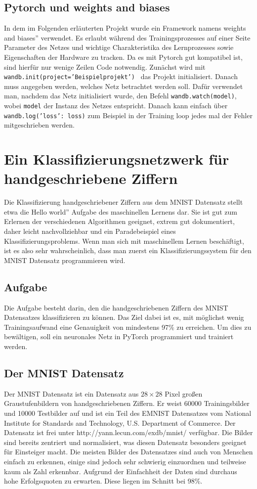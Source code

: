 \documentclass[11pt]{article}
\begin{document}
\subsection{Pytorch und weights and biases}
In dem im Folgenden erläuterten Projekt wurde ein Framework namens \glqq weights and biases'' verwendet. Es erlaubt während des Trainingsprozesses auf einer Seite Parameter des Netzes und wichtige Charakteristika des Lernprozesses sowie Eigenschaften der Hardware zu tracken. Da es mit Pytorch gut kompatibel ist, sind hierfür nur wenige Zeilen Code notwendig. Zunächst wird mit\\ \texttt{wandb.init(project='Beispielprojekt')
} das Projekt initialisiert. Danach muss angegeben werden, welches Netz betrachtet werden soll. Dafür verwendet man, nachdem das Netz initialisiert wurde, den Befehl \texttt{wandb.watch(model)}, wobei \texttt{model} der Instanz des Netzes entspricht. Danach kann einfach über\\ 
\texttt{wandb.log({'loss': loss})} zum Beispiel in der Training loop jedes mal der Fehler mitgeschrieben werden.
\section{Ein Klassifizierungsnetzwerk für handgeschriebene Ziffern}
Die Klassifizierung handgeschriebener Ziffern aus dem MNIST Datensatz stellt etwa die \glqq Hello world'' Aufgabe des maschinellen Lernens dar. Sie ist gut zum Erlernen der verschiedenen Algorithmen geeignet, extrem gut dokumentiert, daher leicht nachvollziehbar und ein Paradebeispiel eines Klassifizierungsproblems. Wenn man sich mit maschinellem Lernen beschäftigt, ist es also sehr wahrscheinlich, dass man zuerst ein Klassifizierungssystem für den MNIST Datensatz programmieren wird.
\subsection{Aufgabe}
Die Aufgabe besteht darin, den die handgeschriebenen Ziffern des MNIST Datensatzes klassifizieren zu können. Das Ziel dabei ist es, mit möglichst wenig Trainingsaufwand eine Genauigkeit von mindestens 97\% zu erreichen. Um dies zu bewältigen, soll ein neuronales Netz in PyTorch programmiert und trainiert werden.
\subsection{Der MNIST Datensatz}
Der MNIST Datensatz ist ein Datensatz aus $28\times28$ Pixel großen Graustufenbildern von handgeschriebenen Ziffern. Er weist 60000 Trainingsbilder und 10000 Testbilder auf und ist ein Teil des EMNIST Datensatzes vom National Institute for Standards and Technology, U.S. Department of Commerce. Der Datensatz ist frei unter http://yann.lecun.com/exdb/mnist/ verfügbar. Die Bilder sind bereits zentriert und normalisiert, was diesen Datensatz besonders geeignet für Einsteiger macht. Die meisten Bilder des Datensatzes sind auch von Menschen einfach zu erkennen, einige sind jedoch sehr schwierig einzuordnen und teilweise kaum als Zahl erkennbar. Aufgrund der Einfachheit der Daten sind durchaus hohe Erfolgsquoten zu erwarten. Diese liegen im Schnitt bei 98\%.
\end{document}
